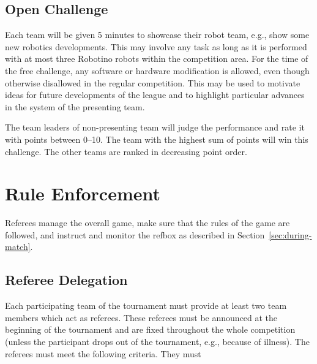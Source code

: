 \documentclass[12pt,twoside]{article}
\newcommand{\refsec}[1]{Section~\ref{#1}}
\begin{document}
%

\subsection{Open Challenge}\label{sec:open-challenge}
Each team will be given 5 minutes to showcase their robot team, e.g.,
show some new robotics developments. This may involve any task as long
as it is performed with at most three Robotino robots within the
competition area. For the time of the free challenge, any software or
hardware modification is allowed, even though otherwise disallowed in
the regular competition. This may be used to motivate ideas for future
developments of the league and to highlight particular advances in the
system of the presenting team.

The team leaders of non-presenting team will judge the performance and
rate it with points between 0--10.  The team with the highest sum of
points will win this challenge. The other teams are ranked in
decreasing point order.


\section{Rule Enforcement}
\label{sec:rule-enforcement}
Referees manage the overall game, make sure that the rules of the game
are followed, and instruct and monitor the \ac{refbox} as described in
\refsec{sec:during-match}.

\subsection{Referee Delegation}
Each participating team of the tournament must provide at least two
team members which act as referees. These referees must be announced
at the beginning of the tournament and are fixed throughout the whole
competition (unless the participant drops out of the tournament,
e.g., because of illness). The referees must meet the following
criteria. They must
\end{document}
